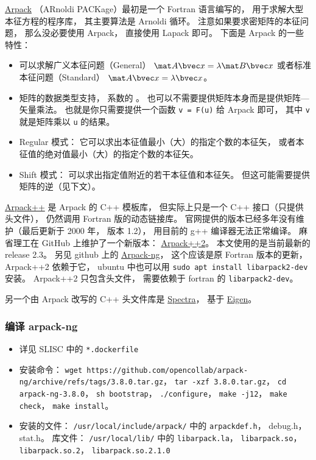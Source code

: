 

\href{https://www.caam.rice.edu/software/ARPACK/}{Arpack} （ARnoldi PACKage）最初是一个 Fortran 语言编写的， 用于求解大型本征方程的程序库， 其主要算法是 Arnoldi 循环。 注意如果要求密矩阵的本征问题， 那么没必要使用 Arpack， 直接使用 Lapack 即可。 下面是 Arpack 的一些特性：
\begin{itemize}
\item 可以求解广义本征问题（General） $\mat A\bvec x = \lambda \mat B\bvec x$ 或者标准本征问题（Standard） $\mat A\bvec x = \lambda \bvec x$。
\item 矩阵的数据类型支持， 系数的 。 也可以不需要提供矩阵本身而是提供矩阵—矢量乘法。 也就是你只需要提供一个函数 \verb`v = F(u)` 给 Arpack 即可， 其中 \verb`v` 就是矩阵乘以 \verb`u` 的结果。
\item Regular 模式： 它可以求出本征值最小（大）的指定个数的本征矢， 或者本征值的绝对值最小（大）的指定个数的本征矢。
\item Shift 模式： 可以求出指定值附近的若干本征值和本征矢。 但这可能需要提供矩阵的逆（见下文）。
\end{itemize}

\href{http://www.ime.unicamp.br/~chico/arpack++/}{Arpack++} 是 Arpack 的 C++ 模板库， 但实际上只是一个 C++ 接口（只提供头文件）， 仍然调用 Fortran 版的动态链接库。 官网提供的版本已经多年没有维护（最后更新于 2000 年， 版本 1.2）， 用目前的 g++ 编译器无法正常编译。 麻省理工在 GitHub 上维护了一个新版本： \href{https://github.com/m-reuter/arpackpp}{Arpack++2}。 本文使用的是当前最新的 release 2.3。 另见 github 上的 \href{https://github.com/opencollab/arpack-ng}{Arpack-ng}， 这个应该是原 Fortran 版本的更新， Arpack++2 依赖于它， ubuntu 中也可以用 \verb`sudo apt install libarpack2-dev` 安装。 Arpack++2 只包含头文件， 需要依赖于 fortran 的 \verb`libarpack2-dev`。

另一个由 Arpack 改写的 C++ 头文件库是 \href{https://spectralib.org/}{Spectra}， 基于 \href{https://eigen.tuxfamily.org/index.php?title=Main_Page}{Eigen}。

\subsubsection{编译 arpack-ng}
\begin{itemize}
\item 详见 SLISC 中的 \verb`*.dockerfile`
\item 安装命令： \verb`wget https://github.com/opencollab/arpack-ng/archive/refs/tags/3.8.0.tar.gz`， \verb`tar -xzf 3.8.0.tar.gz`， \verb`cd arpack-ng-3.8.0`， \verb`sh bootstrap`， \verb`./configure`， \verb`make -j12`， \verb`make check`， \verb`make install`。
\item 安装的文件： \verb`/usr/local/include/arpack/` 中的 \verb`arpackdef.h`， debug.h， stat.h。 库文件： \verb`/usr/local/lib/` 中的 \verb`libarpack.la`， \verb`libarpack.so`， \verb`libarpack.so.2`， \verb`libarpack.so.2.1.0`
\end{itemize}

